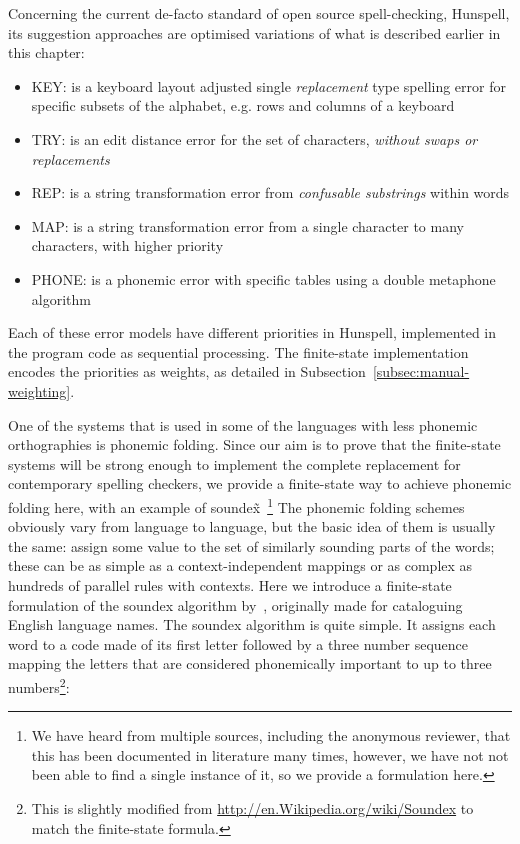 \documentclass[a4paper,12pt]{article}
\begin{document}
Concerning the current de-facto standard of open source spell-checking,
Hunspell, its suggestion approaches are optimised variations of what is
described earlier in this chapter:

\begin{itemize}
    \item KEY: is a keyboard layout adjusted single \emph{replacement} type
        spelling error for specific subsets of the alphabet, e.g. rows and 
        columns of a keyboard
    \item TRY: is an edit distance error for the set of characters, 
        \emph{without swaps or replacements}
    \item REP: is a string transformation error from \emph{confusable
        substrings} within words
    \item MAP: is a string transformation error from a single character to 
        many characters, with higher priority
    \item PHONE: is a phonemic error with specific tables using a double
        metaphone algorithm
\end{itemize}

Each of these error models have different priorities in Hunspell, implemented
in the program code as sequential processing. The finite-state implementation
encodes the priorities as weights, as detailed in
Subsection~\ref{subsec:manual-weighting}.

One of the systems that is used in some of the languages with less phonemic
orthographies is phonemic folding. Since our aim is to prove that the
finite-state systems will be strong enough to implement the complete
replacement for contemporary spelling checkers, we provide a finite-state way
to achieve phonemic folding here, with an example of soundex̃~\footnote{We have
    heard from multiple sources, including the anonymous reviewer, that this
    has been documented in literature many times, however, we have not not been
able to find a single instance of it, so we provide a formulation here.}
The phonemic folding schemes obviously vary from language to language, but the
basic idea of them is usually the same: assign some value to the set of
similarly sounding parts of the words; these can be as simple as a
context-independent mappings or as complex as hundreds of parallel rules with
contexts. Here we introduce a finite-state formulation of the soundex algorithm
by~\cite{russell1918soundex}, originally made for cataloguing English language
names. The soundex algorithm is quite simple. It assigns each word to a code
made of its first letter followed by a three number sequence mapping the
letters that are considered phonemically important to up to three
numbers\footnote{This is slightly modified from
\url{http://en.Wikipedia.org/wiki/Soundex} to match the finite-state formula.}:
\end{document}
